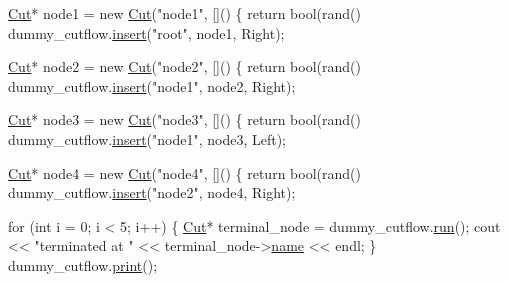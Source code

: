\begin{DoxyEnumerate}
\begin{DoxyCode}
\hyperlink{classCut}{Cut}* node1 = \textcolor{keyword}{new} \hyperlink{classCut}{Cut}(\textcolor{stringliteral}{"node1"}, []() \{ \textcolor{keywordflow}{return} bool(rand() %
dummy\_cutflow.\hyperlink{classCutflow_a8da46f1053a6b97991489ee0920c29a1}{insert}(\textcolor{stringliteral}{"root"}, node1, Right);

\hyperlink{classCut}{Cut}* node2 = \textcolor{keyword}{new} \hyperlink{classCut}{Cut}(\textcolor{stringliteral}{"node2"}, []() \{ \textcolor{keywordflow}{return} bool(rand() %
dummy\_cutflow.\hyperlink{classCutflow_a8da46f1053a6b97991489ee0920c29a1}{insert}(\textcolor{stringliteral}{"node1"}, node2, Right);

\hyperlink{classCut}{Cut}* node3 = \textcolor{keyword}{new} \hyperlink{classCut}{Cut}(\textcolor{stringliteral}{"node3"}, []() \{ \textcolor{keywordflow}{return} bool(rand() %
dummy\_cutflow.\hyperlink{classCutflow_a8da46f1053a6b97991489ee0920c29a1}{insert}(\textcolor{stringliteral}{"node1"}, node3, Left);

\hyperlink{classCut}{Cut}* node4 = \textcolor{keyword}{new} \hyperlink{classCut}{Cut}(\textcolor{stringliteral}{"node4"}, []() \{ \textcolor{keywordflow}{return} bool(rand() %
dummy\_cutflow.\hyperlink{classCutflow_a8da46f1053a6b97991489ee0920c29a1}{insert}(\textcolor{stringliteral}{"node2"}, node4, Right);

\textcolor{keywordflow}{for} (\textcolor{keywordtype}{int} i = 0; i < 5; i++)
\{
    \hyperlink{classCut}{Cut}* terminal\_node = dummy\_cutflow.\hyperlink{classCutflow_a563da4fc41aa5c611dd0ce37ce966f2c}{run}();
    cout << \textcolor{stringliteral}{"terminated at "} << terminal\_node->\hyperlink{classCut_accf700d2d00746b97a265d4aea3f55c2}{name} << endl;
\}
dummy\_cutflow.\hyperlink{classCutflow_a0cb4c8bd6d15ace1f85fe0cfb8d9d828}{print}();
\end{DoxyCode}
 
\end{DoxyEnumerate}